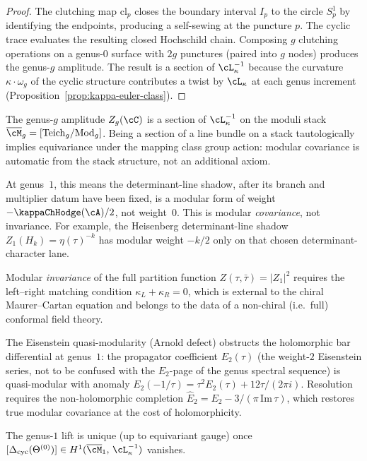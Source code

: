 \begin{proof}
The clutching map $\mathrm{cl}_p$ closes the boundary interval $I_p$ to the circle $S^1_p$ by identifying the endpoints, producing a self-sewing at the puncture $p$. The cyclic trace evaluates the resulting closed Hochschild chain. Composing $g$ clutching operations on a genus-$0$ surface with $2g$ punctures (paired into $g$ nodes) produces the genus-$g$ amplitude. The result is a section of $\cL_\kappa^{-1}$ because the curvature $\kappa \cdot \omega_g$ of the cyclic structure contributes a twist by $\cL_\kappa$ at each genus increment (Proposition~\ref{prop:kappa-euler-class}).
\end{proof}

\begin{remark}
\label{rem:modular-covariance-automatic}
The genus-$g$ amplitude $Z_g(\cC)$ is a section of $\cL_\kappa^{-1}$ on the moduli
stack $\overline{\cM}_g = [\mathrm{Teich}_g / \mathrm{Mod}_g]$. Being a section of a
line bundle on a stack tautologically implies equivariance under the mapping class
group action: modular covariance is automatic from the stack structure, not an
additional axiom.

At genus~$1$, this means the determinant-line shadow, after its branch
and multiplier datum have been fixed, is a modular form of weight
$-\kappaChHodge(\cA)/2$, not weight~$0$. This is modular
\emph{covariance}, not invariance. For example, the Heisenberg
determinant-line shadow $Z_1(H_k)=\eta(\tau)^{-k}$ has modular weight
$-k/2$ only on that chosen determinant-character lane.

Modular \emph{invariance} of the full partition function
$Z(\tau,\bar{\tau}) = |Z_1|^2$ requires the left--right matching condition
$\kappa_L + \kappa_R = 0$, which is external to the chiral Maurer--Cartan equation
and belongs to the data of a non-chiral (i.e.\ full) conformal field theory.

The Eisenstein quasi-modularity (Arnold defect) obstructs the holomorphic bar differential
at genus~$1$: the propagator coefficient $E_2(\tau)$ (the weight-$2$ Eisenstein series,
not to be confused with the $E_2$-page of the genus spectral sequence) is quasi-modular
with anomaly $E_2(-1/\tau) = \tau^2 E_2(\tau) + 12\tau/(2\pi i)$. Resolution requires
the non-holomorphic completion
$\widehat{E}_2 = E_2 - 3/(\pi\,\mathrm{Im}\,\tau)$, which restores true modular
covariance at the cost of holomorphicity.

The genus-$1$ lift is unique (up to equivariant gauge) once
$[\Delta_{\mathrm{cyc}}(\Theta^{(0)})] \in H^1(\overline{\cM}_1,\,\cL_\kappa^{-1})$
vanishes.
\end{remark}

